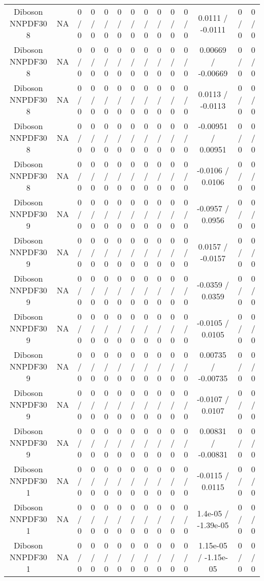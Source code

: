 \documentclass[10pt]{article}
\begin{document}
\begin{table}[htbp]
\begin{center}
\begin{tabular}{|c|c|c|c|c|c|c|c|c|c|c|c|c|c|}
  Diboson NNPDF30 8 &    NA    & 0 / 0 & 0 / 0 & 0 / 0 & 0 / 0 & 0 / 0 & 0 / 0 & 0 / 0 & 0 / 0 & 0 / 0 & 0.0111 / -0.0111 & 0 / 0 & 0 / 0 \\ 
  Diboson NNPDF30 8 &    NA    & 0 / 0 & 0 / 0 & 0 / 0 & 0 / 0 & 0 / 0 & 0 / 0 & 0 / 0 & 0 / 0 & 0 / 0 & 0.00669 / -0.00669 & 0 / 0 & 0 / 0 \\ 
  Diboson NNPDF30 8 &    NA    & 0 / 0 & 0 / 0 & 0 / 0 & 0 / 0 & 0 / 0 & 0 / 0 & 0 / 0 & 0 / 0 & 0 / 0 & 0.0113 / -0.0113 & 0 / 0 & 0 / 0 \\ 
  Diboson NNPDF30 8 &    NA    & 0 / 0 & 0 / 0 & 0 / 0 & 0 / 0 & 0 / 0 & 0 / 0 & 0 / 0 & 0 / 0 & 0 / 0 & -0.00951 / 0.00951 & 0 / 0 & 0 / 0 \\ 
  Diboson NNPDF30 8 &    NA    & 0 / 0 & 0 / 0 & 0 / 0 & 0 / 0 & 0 / 0 & 0 / 0 & 0 / 0 & 0 / 0 & 0 / 0 & -0.0106 / 0.0106 & 0 / 0 & 0 / 0 \\ 
  Diboson NNPDF30 9 &    NA    & 0 / 0 & 0 / 0 & 0 / 0 & 0 / 0 & 0 / 0 & 0 / 0 & 0 / 0 & 0 / 0 & 0 / 0 & -0.0957 / 0.0956 & 0 / 0 & 0 / 0 \\ 
  Diboson NNPDF30 9 &    NA    & 0 / 0 & 0 / 0 & 0 / 0 & 0 / 0 & 0 / 0 & 0 / 0 & 0 / 0 & 0 / 0 & 0 / 0 & 0.0157 / -0.0157 & 0 / 0 & 0 / 0 \\ 
  Diboson NNPDF30 9 &    NA    & 0 / 0 & 0 / 0 & 0 / 0 & 0 / 0 & 0 / 0 & 0 / 0 & 0 / 0 & 0 / 0 & 0 / 0 & -0.0359 / 0.0359 & 0 / 0 & 0 / 0 \\ 
  Diboson NNPDF30 9 &    NA    & 0 / 0 & 0 / 0 & 0 / 0 & 0 / 0 & 0 / 0 & 0 / 0 & 0 / 0 & 0 / 0 & 0 / 0 & -0.0105 / 0.0105 & 0 / 0 & 0 / 0 \\ 
  Diboson NNPDF30 9 &    NA    & 0 / 0 & 0 / 0 & 0 / 0 & 0 / 0 & 0 / 0 & 0 / 0 & 0 / 0 & 0 / 0 & 0 / 0 & 0.00735 / -0.00735 & 0 / 0 & 0 / 0 \\ 
  Diboson NNPDF30 9 &    NA    & 0 / 0 & 0 / 0 & 0 / 0 & 0 / 0 & 0 / 0 & 0 / 0 & 0 / 0 & 0 / 0 & 0 / 0 & -0.0107 / 0.0107 & 0 / 0 & 0 / 0 \\ 
  Diboson NNPDF30 9 &    NA    & 0 / 0 & 0 / 0 & 0 / 0 & 0 / 0 & 0 / 0 & 0 / 0 & 0 / 0 & 0 / 0 & 0 / 0 & 0.00831 / -0.00831 & 0 / 0 & 0 / 0 \\ 
  Diboson NNPDF30 1 &    NA    & 0 / 0 & 0 / 0 & 0 / 0 & 0 / 0 & 0 / 0 & 0 / 0 & 0 / 0 & 0 / 0 & 0 / 0 & -0.0115 / 0.0115 & 0 / 0 & 0 / 0 \\ 
  Diboson NNPDF30 1 &    NA    & 0 / 0 & 0 / 0 & 0 / 0 & 0 / 0 & 0 / 0 & 0 / 0 & 0 / 0 & 0 / 0 & 0 / 0 & 1.4e-05 / -1.39e-05 & 0 / 0 & 0 / 0 \\ 
  Diboson NNPDF30 1 &    NA    & 0 / 0 & 0 / 0 & 0 / 0 & 0 / 0 & 0 / 0 & 0 / 0 & 0 / 0 & 0 / 0 & 0 / 0 & 1.15e-05 / -1.15e-05 & 0 / 0 & 0 / 0 \\ 

\end{tabular}
\end{center}
\end{table}
\end{document}
